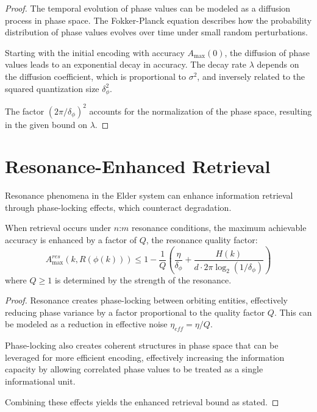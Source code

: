 \begin{proof}
The temporal evolution of phase values can be modeled as a diffusion process in phase space. The Fokker-Planck equation describes how the probability distribution of phase values evolves over time under small random perturbations.

Starting with the initial encoding with accuracy $A_{\max}(0)$, the diffusion of phase values leads to an exponential decay in accuracy. The decay rate $\lambda$ depends on the diffusion coefficient, which is proportional to $\sigma^2$, and inversely related to the squared quantization size $\delta_\phi^2$.

The factor $(2\pi/\delta_\phi)^2$ accounts for the normalization of the phase space, resulting in the given bound on $\lambda$.
\end{proof}

\section{Resonance-Enhanced Retrieval}

Resonance phenomena in the Elder system can enhance information retrieval through phase-locking effects, which counteract degradation.

\begin{theorem}
When retrieval occurs under $n$:$m$ resonance conditions, the maximum achievable accuracy is enhanced by a factor of $Q$, the resonance quality factor:
\begin{equation}
A_{\max}^{res}(k, R(\phi(k))) \leq 1 - \frac{1}{Q}\left(\frac{\eta}{\delta_\phi} + \frac{H(k)}{d \cdot 2\pi \log_2(1/\delta_\phi)}\right)
\end{equation}
where $Q \geq 1$ is determined by the strength of the resonance.
\end{theorem}

\begin{proof}
Resonance creates phase-locking between orbiting entities, effectively reducing phase variance by a factor proportional to the quality factor $Q$. This can be modeled as a reduction in effective noise $\eta_{eff} = \eta/Q$.

Phase-locking also creates coherent structures in phase space that can be leveraged for more efficient encoding, effectively increasing the information capacity by allowing correlated phase values to be treated as a single informational unit.

Combining these effects yields the enhanced retrieval bound as stated.
\end{proof}

